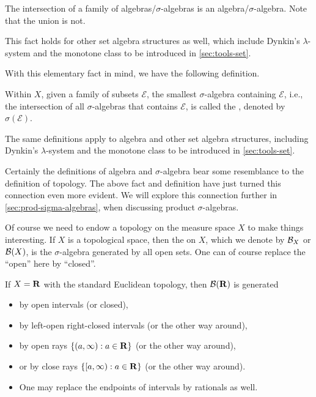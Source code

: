 \begin{fact}
    The intersection of a family of algebras/$\sigma$-algebras is an algebra/$\sigma$-algebra. Note that the union is not.
    
    This fact holds for other set algebra structures as well, which include Dynkin's $\lambda$-system and the monotone class to be introduced in \cref{sec:tools-set}.
\end{fact}

With this elementary fact in mind, we have the following definition.

\begin{defn} \label{def:generate-structure}
    Within $X$, given a family of subsets $\mathcal{E}$, the smallest $\sigma$-algebra containing $\mathcal{E}$, i.e., the intersection of all $\sigma$-algebras that contains $\mathcal{E}$, is called the , denoted by $\sigma(\mathcal{E})$.

    The same definitions apply to algebra and other set algebra structures, including Dynkin's $\lambda$-system and the monotone class to be introduced in \cref{sec:tools-set}.
\end{defn}

Certainly the definitions of algebra and $\sigma$-algebra bear some resemblance to the definition of topology. The above fact and definition have just turned this connection even more evident. We will explore this connection further in \cref{sec:prod-sigma-algebras}, when discussing product $\sigma$-algebras.

Of course we need to endow a topology on the measure space $X$ to make things interesting. If $X$ is a topological space, then the  on $X$, which we denote by $\mathcal{B}_X$ or $\mathcal{B}(X)$, is the $\sigma$-algebra generated by all open sets. One can of course replace the ``open'' here by ``closed''.

If $X = \mathbf{R}$ with the standard Euclidean topology, then $\mathcal{B}(\mathbf{R})$ is generated  
\begin{itemize}
    \item by open intervals (or closed), 
    \item by left-open right-closed intervals (or the other way around), 
    \item by open rays $\{(a,\infty):a\in\mathbf{R}\}$ (or the other way around),
    \item or by close rays $\{[a,\infty):a\in\mathbf{R}\}$ (or the other way around).
    \item One may replace the endpoints of intervals by rationals as well.
\end{itemize}

